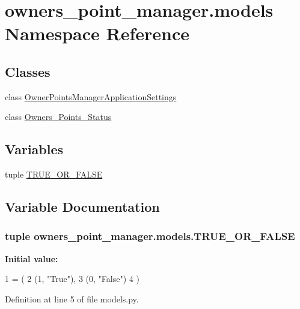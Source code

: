 \hypertarget{namespaceowners__point__manager_1_1models}{\section{owners\-\_\-point\-\_\-manager.\-models Namespace Reference}
\label{namespaceowners__point__manager_1_1models}
}
\subsection*{Classes}
\begin{DoxyCompactItemize}
\item 
class \hyperlink{classowners__point__manager_1_1models_1_1OwnerPointsManagerApplicationSettings}{Owner\-Points\-Manager\-Application\-Settings}
\item 
class \hyperlink{classowners__point__manager_1_1models_1_1Owners__Points__Status}{Owners\-\_\-\-Points\-\_\-\-Status}
\end{DoxyCompactItemize}
\subsection*{Variables}
\begin{DoxyCompactItemize}
\item 
tuple \hyperlink{namespaceowners__point__manager_1_1models_a49393b950814d579d434b57956432564}{T\-R\-U\-E\-\_\-\-O\-R\-\_\-\-F\-A\-L\-S\-E}
\end{DoxyCompactItemize}


\subsection{Variable Documentation}
\hypertarget{namespaceowners__point__manager_1_1models_a49393b950814d579d434b57956432564}{
\subsubsection[{T\-R\-U\-E\-\_\-\-O\-R\-\_\-\-F\-A\-L\-S\-E}]{\setlength{\rightskip}{0pt plus 5cm}tuple owners\-\_\-point\-\_\-manager.\-models.\-T\-R\-U\-E\-\_\-\-O\-R\-\_\-\-F\-A\-L\-S\-E}}\label{namespaceowners__point__manager_1_1models_a49393b950814d579d434b57956432564}
{\bfseries Initial value\-:}
\begin{DoxyCode}
1 = (
2     (1, \textcolor{stringliteral}{"True"}),
3     (0, \textcolor{stringliteral}{"False"})
4 )
\end{DoxyCode}


Definition at line 5 of file models.\-py.

